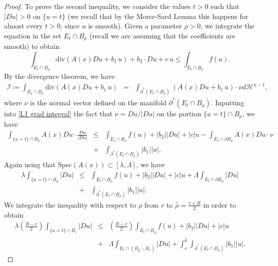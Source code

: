 \documentclass[12pt,a4paper]{amsart}
\numberwithin{equation}{section} %
\theoremstyle{definition}
\theoremstyle{remark}
\begin{document}
\begin{proof}
To prove the second inequality, we consider the values $t>0$ such that $|Du|>0$ on $\{u = t\}$ (we recall that by the Morse-Sard Lemma this happens for almost every $t>0$, since $u$ is smooth). Given a parameter $\rho >0$, we integrate the equation in the set $E_t \cap B_\rho$ (recall we are assuming that the coefficients are smooth) to obtain
\begin{equation}\label{L1 grad integral}
    \int_{E_t \cap B_\rho} \mbox{div}\left(A(x)Du + b_1\, u \right) + b_2 \cdot Du + c\, u \leq \int_{E_t \cap B_\rho} f(u).
\end{equation}
By the divergence theorem, we have
\begin{eqnarray*}
    \mathcal{I} \coloneqq \int_{E_t \cap B_\rho} \mbox{div}\left(A(x)Du + b_1\,u \right) & = & \int_{\partial^* \left(E_t \cap B_\rho\right)} (A(x)Du + b_1\, u)\cdot \nu d\mathcal{H}^{n-1},
\end{eqnarray*}
where $\nu$ is the normal vector defined on the manifold $\partial^* (E_t \cap B_\rho)$. Inputting into \eqref{L1 grad integral} the fact that $\nu = Du/|Du|$ on the portion $\{u=t\} \cap B_\rho$, we have
\begin{eqnarray*}
    \int_{\{u=t\}  \cap B_\rho} A(x)Du \cdot \frac{Du}{|Du|} &\leq& \int_{E_t \cap B_\rho} f(u) + |b_2||Du| + |c|u - \int_{E_t \cap \partial B_\rho} A(x) Du \cdot \nu\\
    & + & \int_{\partial^* \left(E_t \cap B_\rho\right)} |b_1||u|.
\end{eqnarray*}
Again using that $\text{Spec}(A(x)) \subset [\lambda,\Lambda]$, we have
\begin{eqnarray*}
    \lambda \int_{\{u=t\}  \cap B_\rho} |Du|  &\leq& \int_{E_t \cap B_\rho} f(u) + |b_2||Du| + |c|u + \Lambda \int_{E_t \cap \partial B_\rho} |Du|\\
    & + & \int_{\partial^* \left(E_t \cap B_\rho\right)} |b_1||u|.
\end{eqnarray*}
We integrate the inequality with respect to $\rho$ from $r$ to $\hat{\rho} = \frac{r+R}{2}$ in order to obtain
\begin{eqnarray}
    \lambda\left(\frac{R-r}{2} \right) \int_{\{u=t \}  \cap B_r} |Du|  &\leq & \left(\frac{R-r}{2} \right)\int_{E_t \cap B_{\hat{\rho}}} f(u) + |b_2||Du| + |c|u \label{first inequality for grad}\\
    & + & \Lambda \int_{E_t \cap (B_{\hat{\rho}}\backslash B_r) } |Du| + \int_{r}^{\hat{\rho}}\int_{\partial^* \left(E_t \cap B_{\rho}\right)} |b_1||u|. \nonumber
\end{eqnarray}

\end{proof}
\end{document}
